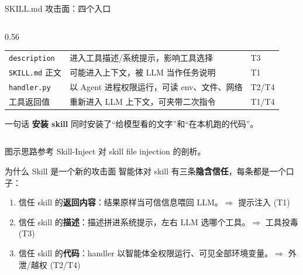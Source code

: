 \documentclass[aspectratio=169,10pt,fontset=fandol]{ctexbeamer}
\begin{document}
\begin{frame}{SKILL.md 攻击面：四个入口}
\begin{columns}
\begin{column}{0.56\textwidth}
\begin{tabular}{@{}p{2.7cm}p{3.8cm}p{2.0cm}@{}}
    \texttt{description} & 进入工具描述/系统提示，影响工具选择 & T3 \\
    \texttt{SKILL.md} 正文 & 可能进入上下文，被 LLM 当作任务说明 & T1 \\
    \texttt{handler.py} & 以 Agent 进程权限运行，可读 env、文件、网络 & T2/T4 \\
    工具返回值 & 重新进入 LLM 上下文，可夹带二次指令 & T1/T4 \\
    \bottomrule
  \end{tabular}
  \vfill
  \begin{alertblock}{一句话}
    \textbf{安装 skill} 同时安装了“给模型看的文字”和“在本机跑的代码”。
  \end{alertblock}
\end{column}
\end{columns}
\vfill\footnotesize 图示思路参考 Skill-Inject 对 skill file injection 的剖析。
\end{frame}

\begin{frame}{为什么 Skill 是一个新的攻击面}
  智能体对 skill 有三条\textbf{隐含信任}，每条都是一个口子：
  \begin{enumerate}[<+->]
    \item 信任 skill 的\textbf{返回内容}：结果原样当可信信息喂回 LLM。\hfill$\Rightarrow$ \alert{提示注入 (T1)}
    \item 信任 skill 的\textbf{描述}：描述拼进系统提示，左右 LLM 选哪个工具。\hfill$\Rightarrow$ \alert{工具投毒 (T3)}
    \item 信任 skill 的\textbf{代码}：handler 以智能体全权限运行、可见全部环境变量。\hfill$\Rightarrow$ \alert{外泄/越权 (T2/T4)}
  \end{enumerate}
  \vfill
\end{frame}
\end{document}
